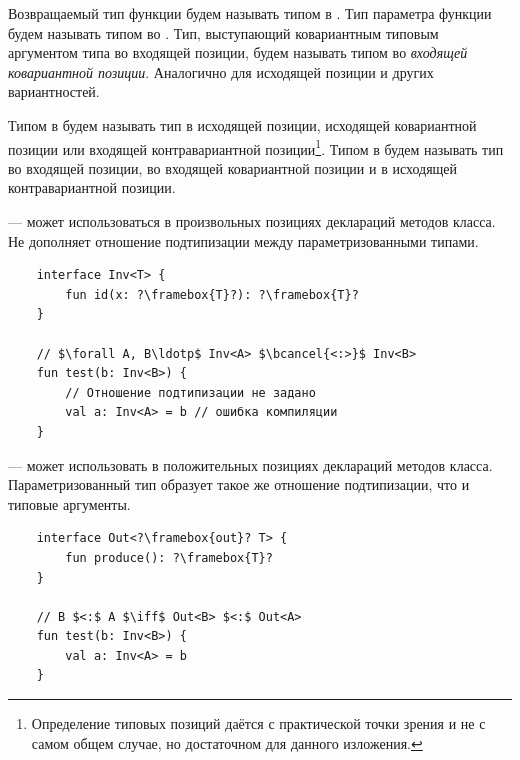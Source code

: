 \begin{definition}
    \label{def:type-positions}
    Возвращаемый тип функции будем называть типом в .
    Тип параметра функции будем называть типом во .
    Тип, выступающий ковариантным типовым аргументом типа во входящей позиции, будем называть типом во \emph{входящей ковариантной позиции}.
    Аналогично для исходящей позиции и других вариантностей.
\end{definition}

\begin{definition}
    \label{def:type-position-sign}
    Типом в  будем называть тип в исходящей позиции, исходящей ковариантной позиции или входящей контравариантной позиции\footnote{Определение типовых позиций даётся с практической точки зрения и не с самом общем случае, но достаточном для данного изложения.}.
    Типом в  будем называть тип во входящей позиции, во входящей ковариантной позиции и в исходящей контравариантной позиции.
\end{definition}

\begin{definition}
    \label{def:invariant}
     --- может использоваться в произвольных позициях деклараций методов класса.
    Не дополняет отношение подтипизации между параметризованными типами.
\end{definition}

\begin{verbatim}
    interface Inv<T> {
        fun id(x: ?\framebox{T}?): ?\framebox{T}?
    }

    // $\forall A, B\ldotp$ Inv<A> $\bcancel{<:>}$ Inv<B>
    fun test(b: Inv<B>) {
        // Отношение подтипизации не задано
        val a: Inv<A> = b // ошибка компиляции
    }
\end{verbatim}

\begin{definition}
    \label{def:covariant}
     --- может использовать в положительных позициях деклараций методов класса.
    Параметризованный тип образует такое же отношение подтипизации, что и типовые аргументы.
\end{definition}

\begin{verbatim}
    interface Out<?\framebox{out}? T> {
        fun produce(): ?\framebox{T}?
    }

    // B $<:$ A $\iff$ Out<B> $<:$ Out<A>
    fun test(b: Inv<B>) {
        val a: Inv<A> = b
    }
\end{verbatim}

